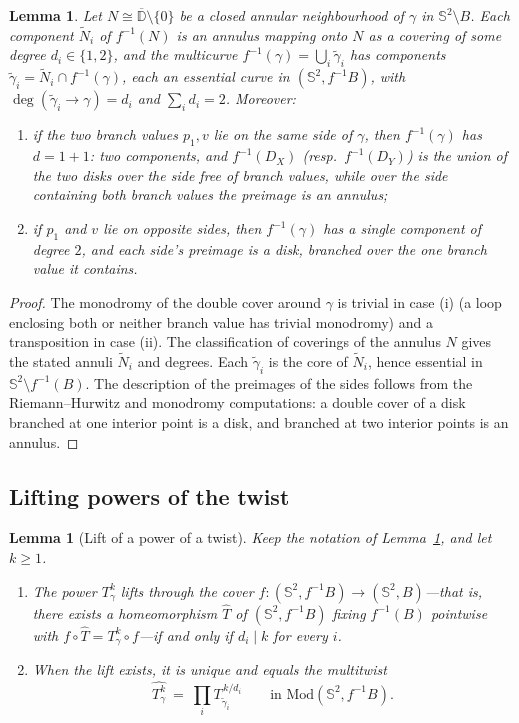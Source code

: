 \documentclass[11pt]{amsart}
\theoremstyle{plain}
\newtheorem{lemma}[theorem]{Lemma}
\theoremstyle{definition}
\newcommand{\Sph}{\mathbb{S}^2}
\newcommand{\Mod}{\mathrm{Mod}}
\begin{document}
\begin{lemma}\label{lem:preimage}
Let $N\cong\overline{\mathbb{D}}\setminus\{0\}$ be a closed annular
neighbourhood of $\gamma$ in $\Sph\setminus B$.  Each component
$\tilde N_i$ of $f^{-1}(N)$ is an annulus mapping onto $N$ as a covering of
some degree $d_i\in\{1,2\}$, and the multicurve
$f^{-1}(\gamma)=\bigcup_i\tilde\gamma_i$
has components $\tilde\gamma_i=\tilde N_i\cap f^{-1}(\gamma)$, each an
essential curve in $(\Sph,f^{-1}B)$, with
$\deg(\tilde\gamma_i\to\gamma)=d_i$ and $\sum_i d_i=2$.
Moreover:
\begin{enumerate}
\item[(i)] if the two branch values $p_1,v$ lie on the \emph{same} side of
$\gamma$, then $f^{-1}(\gamma)$ has $d=1+1$: two components, and
$f^{-1}(D_X)$ (resp.\ $f^{-1}(D_Y)$) is the union of the two disks over the
side free of branch values, while over the side containing both branch
values the preimage is an annulus;
\item[(ii)] if $p_1$ and $v$ lie on \emph{opposite} sides, then
$f^{-1}(\gamma)$ has a single component of degree $2$, and each side's
preimage is a disk, branched over the one branch value it contains.
\end{enumerate}
\end{lemma}

\begin{proof}
The monodromy of the double cover around $\gamma$ is trivial in case (i)
(a loop enclosing both or neither branch value has trivial monodromy) and a
transposition in case (ii).  The classification of coverings of the annulus
$N$ gives the stated annuli $\tilde N_i$ and degrees.  Each
$\tilde\gamma_i$ is the core of $\tilde N_i$, hence essential in
$\Sph\setminus f^{-1}(B)$.  The description of the preimages of the sides
follows from the Riemann--Hurwitz and monodromy computations: a double
cover of a disk branched at one interior point is a disk, and branched at
two interior points is an annulus.
\end{proof}

\subsection{Lifting powers of the twist}

\begin{lemma}[Lift of a power of a twist]\label{lem:lift}
Keep the notation of Lemma~\ref{lem:preimage}, and let $k\ge1$.
\begin{enumerate}
\item The power $T_\gamma^{k}$ lifts through the cover
$f:(\Sph,f^{-1}B)\to(\Sph,B)$---that is, there exists a homeomorphism
$\widehat{T}$ of $(\Sph,f^{-1}B)$ fixing $f^{-1}(B)$ pointwise with
$f\circ\widehat{T}=T_\gamma^{k}\circ f$---if and only if $d_i\mid k$ for
every $i$.
\item When the lift exists, it is unique and equals the multitwist
\begin{equation}\label{eq:liftformula}
\widehat{T_\gamma^{k}}\ =\ \prod_i T_{\tilde\gamma_i}^{\,k/d_i}
\qquad\text{in }\Mod(\Sph,f^{-1}B).
\end{equation}
\end{enumerate}
\end{lemma}
\end{document}
